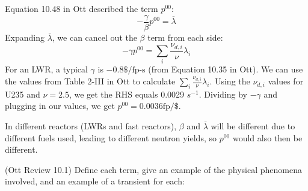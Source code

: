 \documentclass[11pt,addpoints,answers]{exam}
\begin{document}
\begin{questions}
        \begin{solution}
            Equation 10.48 in Ott described the term $p^{00}$:
            \begin{equation}
                -\frac{\gamma}{\beta} p^{00} = \overline{\lambda}
            \end{equation}
            Expanding $\overline{\lambda}$, we can cancel out the $\beta$ term
            from each side:
            \begin{equation}
                -\gamma p^{00} = \sum_{i} \frac{\nu_{d,i}}{\nu} \lambda_{i}
            \end{equation}
            For an LWR, a typical $\gamma$ is $-0.8\$/\text{fp-s}$ (from
            Equation 10.35 in Ott). We can use the values from Table 2-III in
            Ott to calculate $\sum_{i} \frac{\nu_{d,i}}{\nu}
            \lambda_{i}$. Using the $\nu_{d,i}$ values for U235 and $\nu = 2.5$,
            we get the RHS equals 0.0029 $s^{-1}$. Dividing by $-\gamma$ and
            plugging in our values, we get $p^{00} = 0.0036 \text{fp/\$}$.

            In different reactors (LWRs and fast reactors), $\beta$ and
            $\overline{\lambda}$ will be different due to different fuels used,
            leading to different neutron yields, so $p^{00}$ would also then
            be different.

        \end{solution}

        \question[15] (Ott Review 10.1) Define each term, give an example of the 
        physical phenomena involved, and an example of a transient for each: 
\end{questions}
\end{document}
